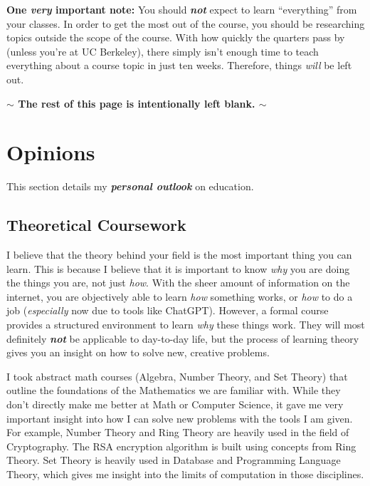 \documentclass[11pt]{article}
\newenvironment{example}{
\begin{tcolorbox}[title=Example, colback=blue!5!white, colframe=black!75!blue]
}{ \end{tcolorbox} }
\renewcommand{\it}[1]{\textit{{#1}}}
\renewcommand{\bf}[1]{\textbf{{#1}}}
\newcommand{\ib}[1]{\textit{\textbf{{#1}}}}
\begin{document}
\bf{One \ib{very} important note:} You should \ib{not} expect to learn ``everything''
from your classes. In order to get the most out of the course, you should be
researching topics outside the scope of the course. With how quickly the
quarters pass by (unless you're at UC Berkeley), there simply isn't enough time
to teach everything about a course topic in just ten weeks. Therefore, things
\it{will} be left out.
\begin{center}
  \vspace{5em}
  \bf{$\bm{\sim}$ The rest of this page is intentionally left blank. $\bm{\sim}$}
\end{center}

\newpage
\section{Opinions}
This section details my \ib{personal outlook} on education.
\subsection{Theoretical Coursework}
I believe that the theory behind your field is the most important thing you can
learn. This is because I believe that it is important to know \it{why} you are
doing the things you are, not just \it{how}. With the sheer amount of
information on the internet, you are objectively able to learn \it{how}
something works, or \it{how} to do a job (\it{especially} now due to tools like
ChatGPT). However, a formal course provides a structured environment to learn
\it{why} these things work. They will most definitely \ib{not} be applicable to
day-to-day life, but the process of learning theory gives you an insight on how
to solve new, creative problems.
\begin{example}
  I took abstract math courses (Algebra, Number Theory, and Set Theory) that
  outline the foundations of the Mathematics we are familiar with. While they
  don't directly make me better at Math or Computer Science, it gave me very
  important insight into how I can solve new problems with the tools I am
  given. For example, Number Theory and Ring Theory are heavily used in the
  field of Cryptography. The RSA encryption algorithm is built using concepts
  from Ring Theory. Set Theory is heavily used in Database and Programming
  Language Theory, which gives me insight into the limits of computation in
  those disciplines.
\end{example}
\end{document}
